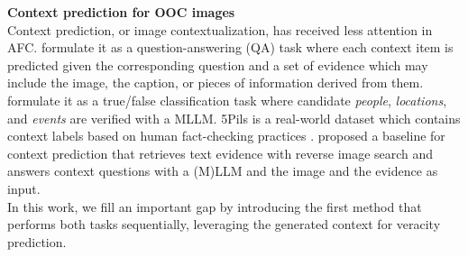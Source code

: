 \noindent \textbf{Context prediction for OOC images}\\
Context prediction, or image contextualization, has received less attention in AFC. \citet{tonglet-etal-2024-image} formulate it as a question-answering (QA) task where each context item is predicted given the corresponding question and a set of evidence which may include the image, the caption, or pieces of information derived from them. \citet{tahmasebi2025verifyingcrossmodalentityconsistency} formulate it as a true/false classification task where candidate \textit{people}, \textit{locations}, and \textit{events} are verified with a MLLM. 5Pils is a real-world dataset \citep{tonglet-etal-2024-image} which  contains context labels based on human fact-checking practices \citep{urbani2020verifying,bellingcat2021,10017287,khan2024debunking}. \citet{tonglet-etal-2024-image} proposed a baseline for context prediction that retrieves text evidence with reverse image search and answers context questions with a (M)LLM and the image and the evidence as input.\\


In this work, we fill an important gap by introducing the first method that performs both tasks sequentially, leveraging the generated context for veracity prediction.